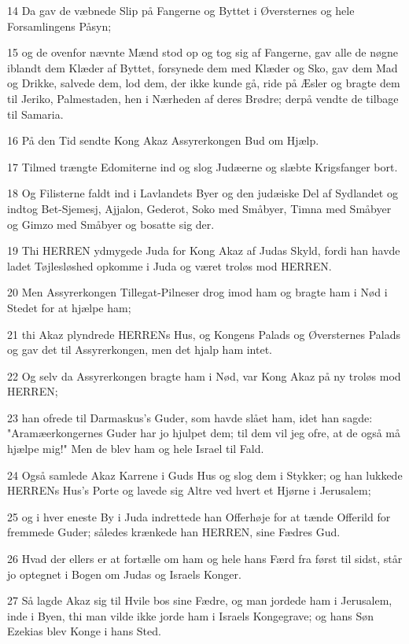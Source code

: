 \par 14 Da gav de væbnede Slip på Fangerne og Byttet i Øversternes og hele Forsamlingens Påsyn;
\par 15 og de ovenfor nævnte Mænd stod op og tog sig af Fangerne, gav alle de nøgne iblandt dem Klæder af Byttet, forsynede dem med Klæder og Sko, gav dem Mad og Drikke, salvede dem, lod dem, der ikke kunde gå, ride på Æsler og bragte dem til Jeriko, Palmestaden, hen i Nærheden af deres Brødre; derpå vendte de tilbage til Samaria.
\par 16 På den Tid sendte Kong Akaz Assyrerkongen Bud om Hjælp.
\par 17 Tilmed trængte Edomiterne ind og slog Judæerne og slæbte Krigsfanger bort.
\par 18 Og Filisterne faldt ind i Lavlandets Byer og den judæiske Del af Sydlandet og indtog Bet-Sjemesj, Ajjalon, Gederot, Soko med Småbyer, Timna med Småbyer og Gimzo med Småbyer og bosatte sig der.
\par 19 Thi HERREN ydmygede Juda for Kong Akaz af Judas Skyld, fordi han havde ladet Tøjlesløshed opkomme i Juda og været troløs mod HERREN.
\par 20 Men Assyrerkongen Tillegat-Pilneser drog imod ham og bragte ham i Nød i Stedet for at hjælpe ham;
\par 21 thi Akaz plyndrede HERRENs Hus, og Kongens Palads og Øversternes Palads og gav det til Assyrerkongen, men det hjalp ham intet.
\par 22 Og selv da Assyrerkongen bragte ham i Nød, var Kong Akaz på ny troløs mod HERREN;
\par 23 han ofrede til Darmaskus's Guder, som havde slået ham, idet han sagde: "Aramæerkongernes Guder har jo hjulpet dem; til dem vil jeg ofre, at de også må hjælpe mig!" Men de blev ham og hele Israel til Fald.
\par 24 Også samlede Akaz Karrene i Guds Hus og slog dem i Stykker; og han lukkede HERRENs Hus's Porte og lavede sig Altre ved hvert et Hjørne i Jerusalem;
\par 25 og i hver eneste By i Juda indrettede han Offerhøje for at tænde Offerild for fremmede Guder; således krænkede han HERREN, sine Fædres Gud.
\par 26 Hvad der ellers er at fortælle om ham og hele hans Færd fra først til sidst, står jo optegnet i Bogen om Judas og Israels Konger.
\par 27 Så lagde Akaz sig til Hvile bos sine Fædre, og man jordede ham i Jerusalem, inde i Byen, thi man vilde ikke jorde ham i Israels Kongegrave; og hans Søn Ezekias blev Konge i hans Sted.

